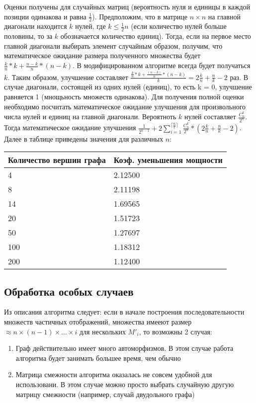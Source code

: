 Оценки получены для случайных матриц (вероятность нуля и единицы в каждой позиции
одинакова и равна $\frac{1}{2}$).
Предположим, что в матрице $n\times n$ на главной диагонали находится $k$ нулей, где $k \leq \frac{1}{2} n$ (если количество нулей больше половины, то за $k$ обозначается количество единиц).
Тогда, если на первое место главной диагонали выбирать элемент случайным образом,
получим, что математическое ожидание размера полученного множества будет $\frac{k}{n}*k + \frac{n-k}{n}*(n-k)$.
В модифицированном алгоритме всегда будет получаться $k$. Таким образом,
улучшение составляет $\frac{\frac{k}{n} * k + \frac{(n-k)}{n} * (n-k)} {k} = 2 \frac{k}{n} + \frac{n}{k} - 2$ раз. В случае диагонали,
состоящей из одних нулей (единиц), то есть k = 0, улучшение равняется 1 (мнощьность
множеств одинакова).
Для получения полной оценки необходимо посчитать математическое ожидание улучшения для
произвольного числа нулей и единиц на главной диагонали. Вероятноть $k$ нулей
составляет $\frac{C_n^k}{2^n}$. Тогда математическое ожидание улучшения $\frac{1}{2^{n-1}} + 2 \sum\limits_{i=1}^{\lceil\frac{n}{2}\rceil} \frac{C_n^k}{2^n} * (2\frac{k}{n} + \frac{n}{k} - 2)$.
Далее в таблице приведены значения для различных $n$:

\begin{tabular}[t]{||l|l||}
\hline
Количество вершин графа & Коэф. уменьшения мощности \\
\hline
4 &  2.12500 \\
\hline
8 & 2.11198 \\
\hline
14 & 1.69565 \\
\hline
20 & 1.51723 \\
\hline
50 & 1.27697 \\
\hline
100 & 1.18312 \\
\hline
200 & 1.12400 \\
\hline
\end{tabular}

\subsection{Обработка особых случаев}
Из описания алгоритма следует: если в начале построения последовательности множеств частичных отображений, множества имееют размер $\approx n \times (n-1) \times \ldots \times i$ для нескольких $M'_i$, то возможны 2 случая:

\begin{enumerate}
\item Граф действительно имеет много автоморфизмов. В этом случае работа алгоритма будет занимать большее время, чем обычно 

\item Матрица смежности алгоритма оказалась не совсем удобной для использовани. В этом случае можно просто выбрать случайную другую матрицу смежности (например, случай двудольного графа)
\end{enumerate} 

